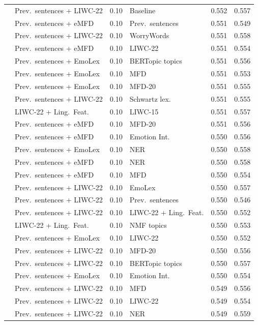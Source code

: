 {\begin{longtable}{llclcc}
 & Prev.\ sentences + LIWC-22 & 0.10 & Baseline & 0.552 & 0.557 \\
 & Prev.\ sentences + eMFD & 0.10 & Prev.\ sentences & 0.551 & 0.549 \\
 & Prev.\ sentences + LIWC-22 & 0.10 & WorryWords & 0.551 & 0.558 \\
 & Prev.\ sentences + eMFD & 0.10 & LIWC-22 & 0.551 & 0.554 \\
 & Prev.\ sentences + EmoLex & 0.10 & BERTopic topics & 0.551 & 0.556 \\
 & Prev.\ sentences + EmoLex & 0.10 & MFD & 0.551 & 0.553 \\
 & Prev.\ sentences + EmoLex & 0.10 & MFD-20 & 0.551 & 0.555 \\
 & Prev.\ sentences + LIWC-22 & 0.10 & Schwartz lex. & 0.551 & 0.555 \\
 & LIWC-22 + Ling.\ Feat. & 0.10 & LIWC-15 & 0.551 & 0.557 \\
 & Prev.\ sentences + eMFD & 0.10 & MFD-20 & 0.551 & 0.556 \\
 & Prev.\ sentences + eMFD & 0.10 & Emotion Int. & 0.550 & 0.556 \\
 & Prev.\ sentences + EmoLex & 0.10 & NER & 0.550 & 0.558 \\
 & Prev.\ sentences + eMFD & 0.10 & NER & 0.550 & 0.558 \\
 & Prev.\ sentences + eMFD & 0.10 & MFD & 0.550 & 0.554 \\
 & Prev.\ sentences + LIWC-22 & 0.10 & EmoLex & 0.550 & 0.557 \\
 & Prev.\ sentences + LIWC-22 & 0.10 & Prev.\ sentences & 0.550 & 0.546 \\
 & Prev.\ sentences + LIWC-22 & 0.10 & LIWC-22 + Ling.\ Feat. & 0.550 & 0.552 \\
 & LIWC-22 + Ling.\ Feat. & 0.10 & NMF topics & 0.550 & 0.553 \\
 & Prev.\ sentences + EmoLex & 0.10 & LIWC-22 & 0.550 & 0.552 \\
 & Prev.\ sentences + LIWC-22 & 0.10 & MFD-20 & 0.550 & 0.556 \\
 & Prev.\ sentences + LIWC-22 & 0.10 & BERTopic topics & 0.550 & 0.557 \\
 & Prev.\ sentences + EmoLex & 0.10 & Emotion Int. & 0.550 & 0.554 \\
 & Prev.\ sentences + LIWC-22 & 0.10 & MFD & 0.549 & 0.556 \\
 & Prev.\ sentences + LIWC-22 & 0.10 & LIWC-22 & 0.549 & 0.554 \\
 & Prev.\ sentences + LIWC-22 & 0.10 & NER & 0.549 & 0.559 \\

\end{longtable}}
